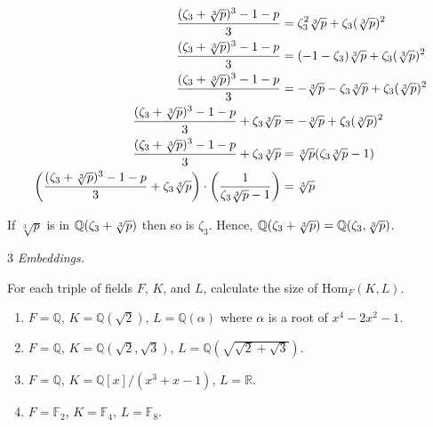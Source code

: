 \documentclass[12pt]{article}
\begin{document}
\begin{solution}
\begin{enumerate}
        \begin{align*}
            \frac{(\zeta_3+ \sqrt[3]{p})^3  - 1 - p}{3} &= \zeta_3^2\sqrt[3]{p} + \zeta_3(\sqrt[3]{p})^2\\ 
            \frac{(\zeta_3+ \sqrt[3]{p})^3  - 1 - p}{3} &= (-1 -\zeta_3)\sqrt[3]{p} + \zeta_3(\sqrt[3]{p})^2  \\
            \frac{(\zeta_3+ \sqrt[3]{p})^3  - 1 - p}{3} &= -\sqrt[3]{p} - \zeta_3\sqrt[3]{p} + \zeta_3(\sqrt[3]{p})^2  \\
            \frac{(\zeta_3+ \sqrt[3]{p})^3  - 1 - p}{3} + \zeta_3\sqrt[3]{p} &= -\sqrt[3]{p} + \zeta_3(\sqrt[3]{p})^2  \\ 
            \frac{(\zeta_3+ \sqrt[3]{p})^3  - 1 - p}{3} + \zeta_3\sqrt[3]{p} &= \sqrt[3]{p} (\zeta_3\sqrt[3]{p} - 1) \\ 
            \left (\frac{(\zeta_3+ \sqrt[3]{p})^3  - 1 - p}{3} + \zeta_3\sqrt[3]{p} \right ) \cdot \left(\frac{1}{\zeta_3\sqrt[3]{p} - 1}\right) &= \sqrt[3]{p} 
        \end{align*}

        If $\sqrt[3]{p}$ is in $\mathbb Q( \zeta_3 +\sqrt[3]{p})$ then so is $\zeta_3$. Hence, $\mathbb Q( \zeta_3 +\sqrt[3]{p}) = \mathbb Q( \zeta_3, \sqrt[3]{p})$. 
    \end{enumerate}
\end{solution}

\newpage

\begin{problem}{3}
\textit{Embeddings.} 

For each triple of fields $F$, $K$, and $L$, calculate the size of $\mathrm{Hom}_F(K,L)$.
\begin{enumerate}
    \item[(a)] $F=\mathbb{Q}$, $K=\mathbb{Q}(\sqrt{2})$, $L=\mathbb{Q}(\alpha)$ where $\alpha$ is a root of
    $x^4-2x^2-1$.

    \item[(b)] $F=\mathbb{Q}$, $K=\mathbb{Q}(\sqrt{2},\sqrt{3})$, $L=\mathbb{Q}(\sqrt{\sqrt{2}+\sqrt{3}})$.

    \item[(c)] $F=\mathbb{Q}$, $K=\mathbb{Q}[x]/(x^3+x-1)$, $L=\mathbb{R}$.

    \item[(d)] $F=\mathbb{F}_2$, $K=\mathbb{F}_4$, $L=\mathbb{F}_8$.
\end{enumerate}
\end{problem}
\end{document}
